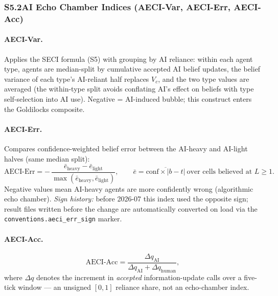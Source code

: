 \subsubsection*{S5.2\enspace AI Echo Chamber Indices (AECI-Var, AECI-Err, AECI-Acc)}

\paragraph{AECI-Var.} Applies the SECI formula (S5) with grouping by AI reliance:
within each agent type, agents are median-split by cumulative accepted AI belief
updates, the belief variance of each type's AI-reliant half replaces $V_c$, and
the two type values are averaged (the within-type split avoids conflating AI's
effect on beliefs with type self-selection into AI use).
Negative = AI-induced bubble; this construct enters the Goldilocks composite.

\paragraph{AECI-Err.} Compares confidence-weighted belief error between the
AI-heavy and AI-light halves (same median split):
%
\begin{equation}
  \mathrm{AECI\text{-}Err}
    = -\,\frac{\bar e_{\mathrm{heavy}} - \bar e_{\mathrm{light}}}
              {\max(\bar e_{\mathrm{heavy}}, \bar e_{\mathrm{light}})},
  \qquad
  \bar e = \overline{\text{conf}\times|b-t|}\ \text{over cells believed at } L\geq1.
  \tag{S6a}
\end{equation}
%
Negative values mean AI-heavy agents are more confidently wrong (algorithmic echo
chamber).
\emph{Sign history:} before 2026-07 this index used the opposite sign; result
files written before the change are automatically converted on load via the
\texttt{conventions.aeci\_err\_sign} marker.

\paragraph{AECI-Acc.}
%
\begin{equation}
  \mathrm{AECI\text{-}Acc} = \frac{\Delta q_{\mathrm{AI}}}
                       {\Delta q_{\mathrm{AI}} + \Delta q_{\mathrm{human}}},
  \tag{S6b}
\end{equation}
%
where $\Delta q$ denotes the increment in \emph{accepted} information-update
calls over a five-tick window --- an unsigned $[0,1]$ reliance share, not an
echo-chamber index.

